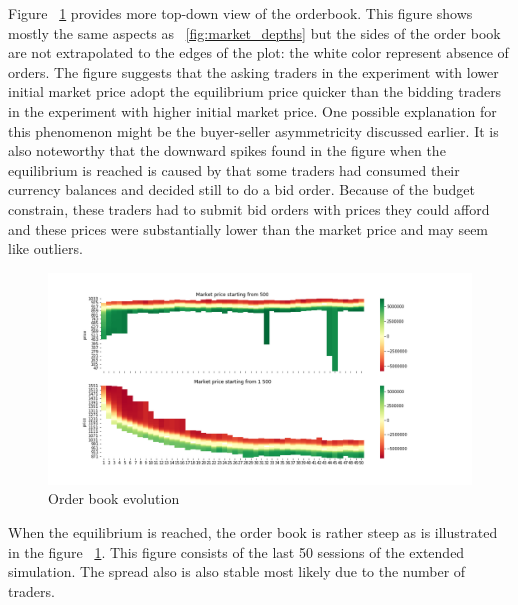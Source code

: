Figure ~\ref{fig:basic_orderbook_evo} provides more top-down view of the orderbook.
This figure shows mostly the same aspects as ~\ref{fig:market_depths} but the sides of the 
order book are not extrapolated to the edges of the plot: the white color represent absence of orders.
The figure suggests that the asking traders in the experiment with lower initial market price
adopt the equilibrium price quicker than the bidding traders in the experiment with higher initial market 
price. One possible explanation for this phenomenon might be the buyer-seller asymmetricity
discussed earlier. It is also noteworthy that the downward spikes found in the figure when the equilibrium
is reached is caused by that some traders had consumed their currency balances and decided 
still to do a bid order. Because of the budget constrain, these traders had to submit bid orders with prices
they could afford and these prices were substantially lower than the market price and may seem like outliers.


\begin{figure}
    \includegraphics[width=\linewidth]{plots/basic_order_book_evo.png}
    \caption{Order book evolution}
    \label{fig:basic_orderbook_evo}
\end{figure}

When the equilibrium is reached, the order book is rather steep as is illustrated in the figure
~\ref{fig:basic_orderbook_evo}. This figure consists of the last 50 sessions of the extended simulation.
The spread also is also stable most likely due to the number of traders. 

